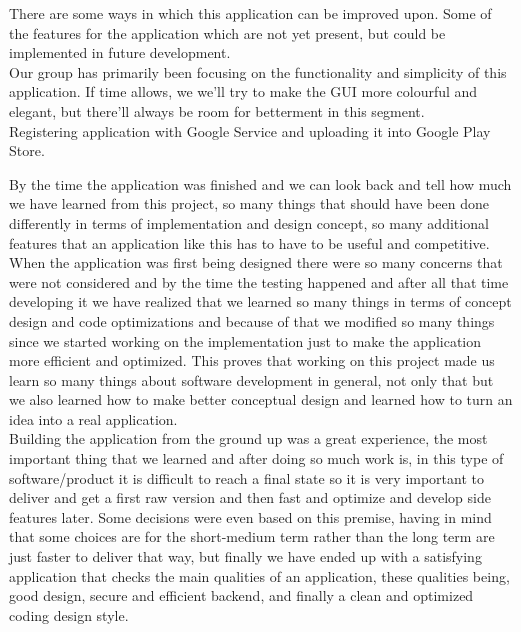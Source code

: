 There are some ways in which this application can be improved upon. Some of the features for the application which are not yet present, but could be implemented in future development.\\

Our group has primarily been focusing on the functionality and simplicity of this application. If time allows, we we'll try to make the GUI more colourful and elegant, but there'll always be room for betterment in this segment.\\

Registering application with Google Service and uploading it into Google Play Store.

By the time the application was finished and we can look back and tell how much we have learned from this project, so many things that should have been done differently in terms of implementation and design concept, so many additional features that an application like this has to have to be useful and competitive. \\

When the application was first being designed there were so many concerns that were not considered and by the time the testing happened and after all that time developing it we have realized that we learned so many things in terms of concept design and code optimizations and because of that we modified so many things since we started working on the implementation just to make the application more efficient and optimized. This proves that working on this project made us learn so many things about software development in general, not only that but we also learned how to make better conceptual design and learned how to turn an idea into a real application.\\

Building the application from the ground up was a great experience, the most important thing that we learned and after doing so much work is, in this type of software/product it is difficult  to reach a final state so it is very important to deliver and get a first raw version and then fast and optimize and develop side features later. Some decisions were even based on this premise, having in mind that some choices are for the short-medium term rather than the long term are just faster to deliver that way, but finally we have ended up with a satisfying application that checks the main qualities of an application, these qualities being, good design, secure and efficient backend, and finally a clean and optimized coding design style.







